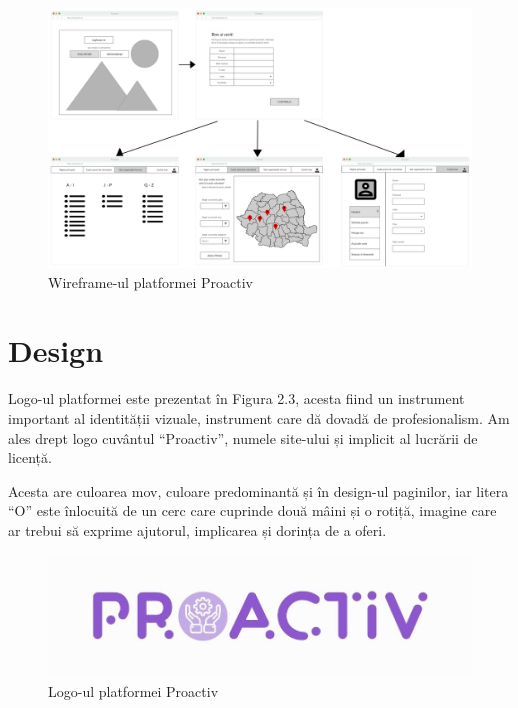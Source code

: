 \documentclass[12pt,a4paper]{report}
\begin{document}
\begin{figure}[H]
\centering
  \includegraphics[width=1\linewidth]{./imagini/GUI.jpg}
  \caption{Wireframe-ul platformei Proactiv}
\end{figure}

\section{Design}
\par
Logo-ul platformei este prezentat în Figura 2.3, acesta fiind un instrument important al identității vizuale, instrument care dă dovadă de profesionalism. Am ales drept logo cuvântul “Proactiv”, numele site-ului și implicit al lucrării de licență. 
\\\par 
Acesta are culoarea mov, culoare predominantă și în design-ul paginilor, iar litera “O” este înlocuită de un cerc care cuprinde două mâini și o rotiță, imagine care ar trebui să exprime ajutorul, implicarea și dorința de a oferi.
\\
\begin{figure}[H]
\centering
  \includegraphics[width=0.5\linewidth]{./imagini/logo.jpg}
  \caption{Logo-ul platformei Proactiv}
\end{figure}
\end{document}
